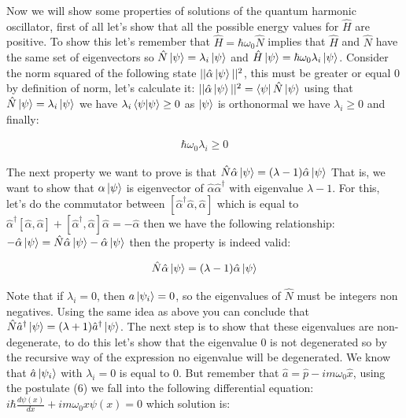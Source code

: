 \documentclass[
  journal=largetwo,
  year=2023,
]{cup-journal}
\begin{document}
Now we will show some properties of solutions of the quantum harmonic oscillator, first of all let's show that all the possible energy values for \(\hat{H}\) are positive. To show this let's remember that \(\hat{H} = \hbar\omega_0\hat{N}\) implies that \(\hat{H}\) and \(\hat{N}\) have the same set of eigenvectors so \(\hat{N}\ket{\psi} = \lambda_i\ket{\psi}\) and \(\hat{H}\ket{\psi} = \hbar\omega_0\lambda_i\ket{\psi}\). Consider the norm squared of the following state \(||\hat{\alpha}\ket{\psi}||^2\), this must be greater or equal 0 by definition of norm, let's calculate it: \(||\hat{\alpha}\ket{\psi}||^2 = \bra{\psi}\hat{N}\ket{\psi}\) using that \(\hat{N}\ket{\psi} = \lambda_i\ket{\psi}\) we have \(\lambda_i\bra{\psi}\ket{\psi} \geq 0\) as \(\ket{\psi}\) is orthonormal we have \(\lambda_i \geq 0\) and finally:

\begin{equation}
  \begin{aligned}\label{eq:13}
    \hbar\omega_0\lambda_i \geq 0
  \end{aligned}
\end{equation}


The next property we want to prove is that \(\hat{N}\hat{\alpha}\ket{\psi} = (\lambda-1)\hat{\alpha}\ket{\psi}\) That is, we want to show that \(\alpha\ket{\psi}\) is eigenvector of \(\hat{\alpha}\hat{\alpha}^{\dag}\) with eigenvalue \(\lambda-1\). For this, let's do the commutator between \([\hat{\alpha}^{\dag}\hat{\alpha}, \hat{\alpha}]\) which is equal to \(\hat{\alpha}^{\dag}[\hat{\alpha}, \hat{\alpha}] + [\hat{\alpha}^{\dag}, \hat{\alpha}]\hat{\alpha} = -\hat{\alpha}\) then we have the following relationship: \(-\hat{\alpha}\ket{\psi} = \hat{N}\hat{\alpha}\ket{\psi} - \hat{\alpha}\ket{\psi} \) then the property is indeed valid:

\begin{equation}
  \begin{aligned}\label{eq:14.1}
    \hat{N}\hat{\alpha}\ket{\psi} = (\lambda-1)\hat{\alpha}\ket{\psi}
  \end{aligned}
\end{equation}


Note that if \(\lambda_i = 0\), then \(a\ket{\psi_i} = 0\), so the eigenvalues of \(\hat{N}\) must be integers non negatives. Using the same idea as above you can conclude that \(\hat{N}\hat{a}^{\dag}\ket{\psi} = (\lambda+1)\hat{a}^{\dag}\ket{\psi}\). The next step is to show that these eigenvalues are non-degenerate, to do this let's show that the eigenvalue 0 is not degenerated so by the recursive way of the expression no eigenvalue will be degenerated. We know that \(\hat{a}\ket{\psi_i}\) with \(\lambda_i = 0\) is equal to \(0\). But remember that \(\hat{a} = \hat{p} - im\omega_0\hat{x}\), using the postulate (6) we fall into the following differential equation: \(i\hbar\frac{d\psi(x)}{dx} + im\omega_0 x\psi(x) = 0\) which solution is:
\end{document}
